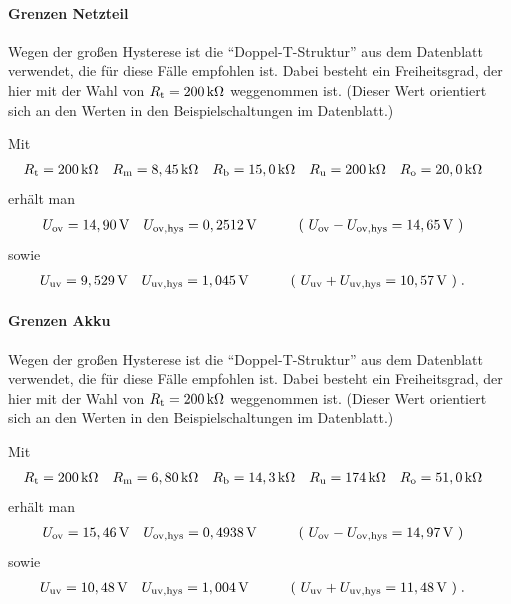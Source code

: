 \paragraph{Grenzen Netzteil}

Wegen der großen Hysterese ist die "`Doppel-T-Struktur"' aus dem Datenblatt verwendet, die für diese Fälle empfohlen ist. Dabei besteht ein Freiheitsgrad, der hier mit der Wahl von $R_{\mathrm{t}} = 200\,\mathrm{k\Omega}$ weggenommen ist. (Dieser Wert orientiert sich an den Werten in den Beispielschaltungen im Datenblatt.)


Mit
\begin{align*}
	R_{\mathrm{t}} & = 200\,\mathrm{k\Omega} &
	R_{\mathrm{m}} & = 8,45\,\mathrm{k\Omega} &
	R_{\mathrm{b}} & = 15,0\,\mathrm{k\Omega} &
	R_{\mathrm{u}} & = 200\,\mathrm{k\Omega} &
	R_{\mathrm{o}} & = 20,0\,\mathrm{k\Omega}
\end{align*}
erhält man
\begin{align*}
	U_{\mathrm{ov}} & = 14,90\,\mathrm{V} &
	U_{\mathrm{ov,hys}} & = 0,2512\,\mathrm{V} &
	\qquad ( \ U_{\mathrm{ov}} - U_{\mathrm{ov,hys}} & = 14,65\,\mathrm{V} \ )
\end{align*}
sowie
\begin{align*}
	U_{\mathrm{uv}} & = 9,529\,\mathrm{V} &
	U_{\mathrm{uv,hys}} & = 1,045\,\mathrm{V} &
	\qquad ( \ U_{\mathrm{uv}} + U_{\mathrm{uv,hys}} & = 10,57\,\mathrm{V} \ )\;.
\end{align*}




\paragraph{Grenzen Akku}

Wegen der großen Hysterese ist die "`Doppel-T-Struktur"' aus dem Datenblatt verwendet, die für diese Fälle empfohlen ist. Dabei besteht ein Freiheitsgrad, der hier mit der Wahl von $R_{\mathrm{t}} = 200\,\mathrm{k\Omega}$ weggenommen ist. (Dieser Wert orientiert sich an den Werten in den Beispielschaltungen im Datenblatt.)

Mit
\begin{align*}
	R_{\mathrm{t}} & = 200\,\mathrm{k\Omega} &
	R_{\mathrm{m}} & = 6,80\,\mathrm{k\Omega} &
	R_{\mathrm{b}} & = 14,3\,\mathrm{k\Omega} &
	R_{\mathrm{u}} & = 174\,\mathrm{k\Omega} &
	R_{\mathrm{o}} & = 51,0\,\mathrm{k\Omega}
\end{align*}
erhält man
\begin{align*}
	U_{\mathrm{ov}} & = 15,46\,\mathrm{V} &
	U_{\mathrm{ov,hys}} & = 0,4938\,\mathrm{V} &
	\qquad ( \ U_{\mathrm{ov}} - U_{\mathrm{ov,hys}} & = 14,97\,\mathrm{V} \ )
\end{align*}
sowie
\begin{align*}
	U_{\mathrm{uv}} & = 10,48\,\mathrm{V} &
	U_{\mathrm{uv,hys}} & = 1,004\,\mathrm{V} &
	\qquad ( \ U_{\mathrm{uv}} + U_{\mathrm{uv,hys}} & = 11,48\,\mathrm{V} \ )\;.
\end{align*}



